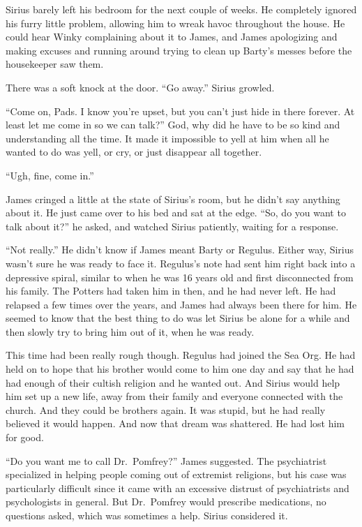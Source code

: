 \documentclass[12pt,twoside,openright]{memoir}
\begin{document}
Sirius barely left his bedroom for the next couple of weeks. He completely ignored his furry little problem, allowing him to wreak havoc throughout the house. He could hear Winky complaining about it to James, and James apologizing and making excuses and running around trying to clean up Barty's messes before the housekeeper saw them.

There was a soft knock at the door. ``Go away.'' Sirius growled. 

``Come on, Pads. I know you're upset, but you can't just hide in there forever. At least let me come in so we can talk?''
God, why did he have to be so kind and understanding all the time. It made it impossible to yell at him when all he wanted to do was yell, or cry, or just disappear all together. 

``Ugh, fine, come in.''

James cringed a little at the state of Sirius's room, but he didn't say anything about it. He just came over to his bed and sat at the edge. ``So, do you want to talk about it?'' he asked, and watched Sirius patiently, waiting for a response.

``Not really.'' He didn't know if James meant Barty or Regulus. Either way, Sirius wasn't sure he was ready to face it. Regulus's note had sent him right back into a depressive spiral, similar to when he was 16 years old and first disconnected from his family. The Potters had taken him in then, and he had never left. He had relapsed a few times over the years, and James had always been there for him. He seemed to know that the best thing to do was let Sirius be alone for a while and then slowly try to bring him out of it, when he was ready. 

This time had been really rough though. Regulus had joined the Sea Org. He had held on to hope that his brother would come to him one day and say that he had had enough of their cultish religion and he wanted out. And Sirius would help him set up a new life, away from their family and everyone connected with the church. And they could be brothers again. It was stupid, but he had really believed it would happen. And now that dream was shattered. He had lost him for good.

``Do you want me to call Dr.\ Pomfrey?'' James suggested. The psychiatrist specialized in helping people coming out of extremist religions, but his case was particularly difficult since it came with an excessive distrust of psychiatrists and psychologists in general. But Dr.\ Pomfrey would prescribe medications, no questions asked, which was sometimes a help. Sirius considered it. 
\end{document}
